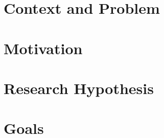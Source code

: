 %
%
%
%
%
\section{Context and Problem}
\section{Motivation}
\section{Research Hypothesis}
\section{Goals}
